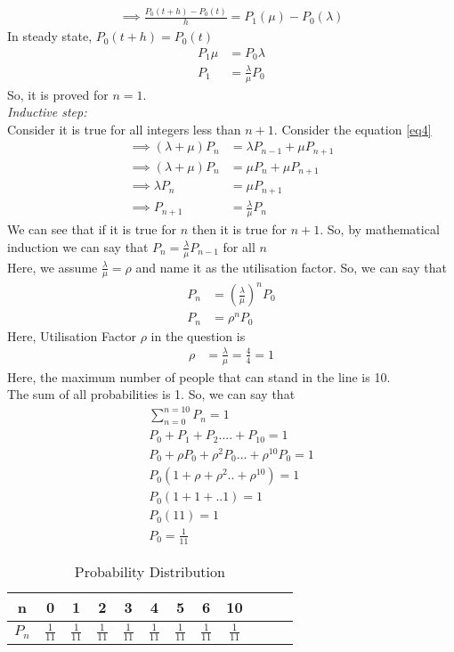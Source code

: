 \documentclass[journal,12pt,twocolumn]{IEEEtran}
\begin{document}
\begin{align}
    \implies \frac{P_0(t+h)-P_0(t)}{h}=P_1(\mu)-P_0(\lambda)
\end{align}
In steady state, $P_0(t+h)=P_0(t)$
\begin{align}
    P_1 \mu &=P_0 \lambda\\
    P_1&= \frac{\lambda}{\mu} P_0
\end{align}
So, it is proved for $n=1$.\\
\textit{Inductive step:}\\
Consider it is true for all integers less than $n+1$.
Consider the equation \eqref{eq4}
\begin{align}
    \implies (\lambda + \mu)P_n&=\lambda P_{n-1} + \mu P_{n+1}\\
    \implies (\lambda + \mu)P_n&= \mu P_n + \mu P_{n+1}\\
    \implies \lambda P_n &= \mu P_{n+1}\\
    \implies P_{n+1}&=\frac{\lambda}{\mu}P_n
\end{align}
We can see that if it is true for $n$ then it is true for $n+1$. So, by mathematical induction we can say that $P_n=\frac{\lambda}{\mu}P_{n-1}$ for all $n$ \\
Here, we assume $\frac{\lambda}{\mu}=\rho$ and name it as the utilisation factor.
So, we can say that 
\begin{align}
    P_n &= \left(\frac{\lambda}{\mu}\right)^n P_0\\
    P_n &= \rho^n P_0
\end{align}
Here, Utilisation Factor $\rho$ in the question is
\begin{align}
    \rho&=\frac{\lambda}{\mu}=\frac{4}{4}=1
\end{align}
Here, the maximum number of people that can stand in the line is 10.\\
The sum of all probabilities is 1. So, we can say that
\begin{align}
    \sum_{n=0}^{n=10}P_{n}=1\\
    P_{0}+P_{1}+P_{2}....+P_{10}=1\\
    P_{0}+\rho P_{0}+\rho^2P_{0}...+\rho^{10}P_{0}=1\\
    P_{0}(1+\rho+\rho^2..+\rho^{10})=1\\
    P_{0}(1+1+..1)=1\\
    P_{0}(11)=1\\
    P_{0}=\frac{1}{11}
\end{align}
\begin{table}[h!]
    \centering
    \begin{tabular}{|c|c|c|c|c|c|c|c|c|c|c|c|}
        \hline
        n & 0 & 1 & 2 & 3 & 4 & 5 & 6 & 10\\
        \hline
        $P_n$ & $\frac{1}{11}$& $\frac{1}{11}$ & $\frac{1}{11}$& $\frac{1}{11}$ & $\frac{1}{11}$& $\frac{1}{11}$ & $\frac{1}{11}$&  $\frac{1}{11}$\\
        \hline
    \end{tabular}
    \label{tab:my_label}
    \caption{Probability Distribution}
\end{table}
\end{document}
